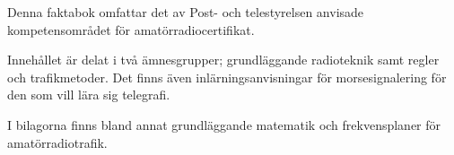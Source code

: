 Denna faktabok omfattar det av Post- och telestyrelsen anvisade
kompetensområdet för amatörradiocertifikat.

Innehållet är delat i två ämnesgrupper; grundläggande radioteknik
samt regler och trafikmetoder.
Det finns även inlärningsanvisningar för morsesignalering för den
som vill lära sig telegrafi.

I bilagorna finns bland annat grundläggande matematik
och frekvensplaner för amatörradiotrafik.
